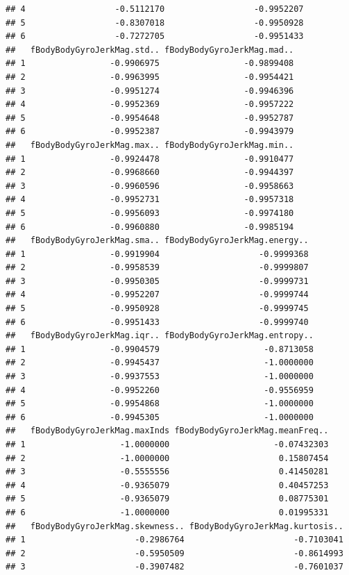 \documentclass[
]{article}
\begin{document}
\begin{verbatim}
## 4                  -0.5112170                  -0.9952207
## 5                  -0.8307018                  -0.9950928
## 6                  -0.7272705                  -0.9951433
##   fBodyBodyGyroJerkMag.std.. fBodyBodyGyroJerkMag.mad..
## 1                 -0.9906975                 -0.9899408
## 2                 -0.9963995                 -0.9954421
## 3                 -0.9951274                 -0.9946396
## 4                 -0.9952369                 -0.9957222
## 5                 -0.9954648                 -0.9952787
## 6                 -0.9952387                 -0.9943979
##   fBodyBodyGyroJerkMag.max.. fBodyBodyGyroJerkMag.min..
## 1                 -0.9924478                 -0.9910477
## 2                 -0.9968660                 -0.9944397
## 3                 -0.9960596                 -0.9958663
## 4                 -0.9952731                 -0.9957318
## 5                 -0.9956093                 -0.9974180
## 6                 -0.9960880                 -0.9985194
##   fBodyBodyGyroJerkMag.sma.. fBodyBodyGyroJerkMag.energy..
## 1                 -0.9919904                    -0.9999368
## 2                 -0.9958539                    -0.9999807
## 3                 -0.9950305                    -0.9999731
## 4                 -0.9952207                    -0.9999744
## 5                 -0.9950928                    -0.9999745
## 6                 -0.9951433                    -0.9999740
##   fBodyBodyGyroJerkMag.iqr.. fBodyBodyGyroJerkMag.entropy..
## 1                 -0.9904579                     -0.8713058
## 2                 -0.9945437                     -1.0000000
## 3                 -0.9937553                     -1.0000000
## 4                 -0.9952260                     -0.9556959
## 5                 -0.9954868                     -1.0000000
## 6                 -0.9945305                     -1.0000000
##   fBodyBodyGyroJerkMag.maxInds fBodyBodyGyroJerkMag.meanFreq..
## 1                   -1.0000000                     -0.07432303
## 2                   -1.0000000                      0.15807454
## 3                   -0.5555556                      0.41450281
## 4                   -0.9365079                      0.40457253
## 5                   -0.9365079                      0.08775301
## 6                   -1.0000000                      0.01995331
##   fBodyBodyGyroJerkMag.skewness.. fBodyBodyGyroJerkMag.kurtosis..
## 1                      -0.2986764                      -0.7103041
## 2                      -0.5950509                      -0.8614993
## 3                      -0.3907482                      -0.7601037

\end{verbatim}
\end{document}
